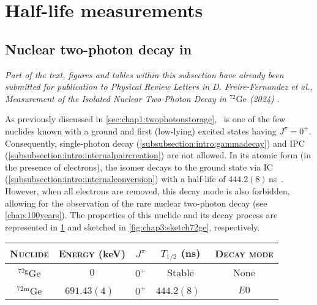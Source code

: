 \section{Half-life measurements}\label{sec:chap3:halflifemeasurements}

  \subsection{Nuclear two-photon decay in \,}\label{subsec:chap3:hl-twophoton}
  \textit{\footnotesize Part of the text, figures and tables within this subsection have already been submitted for publication to Physical Review Letters in D. Freire-Fernandez et al., Measurement of the Isolated Nuclear Two-Photon Decay in $^{72}\mathrm{Ge}$ (2024) \cite{freirefernández2023measurement}}.

  As previously discussed in \cref{sec:chap1:twophotonstorage}, \, is one of the few nuclides known with a ground and first (low-lying) excited states having $J^\pi = 0^{+}$. Consequently, single-photon decay (\cref{subsubsection:intro:gammadecay}) and \textsc{IPC} (\cref{subsubsection:intro:internalpaircreation}) are not allowed. In its atomic form (in the presence of electrons), the isomer decays to the ground state via \textsc{IC} (\cref{subsubsection:intro:internalconversion}) with a half-life of $444.2\left(8\right)$\,ns~\cite{BRAUN1984}. However, when all electrons are removed, this decay mode is also forbidden, allowing for the observation of the rare nuclear two-photon decay (see \cref{chap:100years}). The properties of this nuclide and its decay process are represented in \cref{tab:chap3:72geproperties} and sketched in \cref{fig:chap3:sketch72ge}, respectively.
  \begin{table}[hbt]
    \centering
    \label{tab:chap3:72geproperties}
      \begin{tabular}{ccccc}
      \toprule
      \toprule
      \textsc{Nuclide}                        & \textsc{Energy} (keV)  & $J^{\pi}$ & $T_{1/2}$ (ns) & \textsc{Decay mode} \\ 
      \midrule\midrule
      $^{72\mathrm{g}}\mathrm{Ge}$ & $0$            & $0^+$  & Stable & None \\
      $^{72\mathrm{m}}\mathrm{Ge}$  & $691.43(4)$~\cite{ENSDF}    & $0^+$  & $444.2(8)$~\cite{BRAUN1984} & $E0$ \\
      \bottomrule
      \bottomrule
      \end{tabular}
  \end{table}


